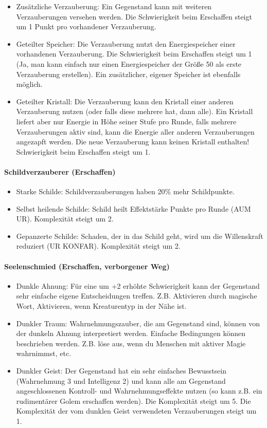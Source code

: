 \documentclass{article}
\begin{document}
\begin{itemize}
\item Zusätzliche Verzauberung: Ein Gegenstand kann mit weiteren Verzauberungen versehen werden. Die Schwierigkeit beim Erschaffen steigt um 1 Punkt pro vorhandener Verzauberung.
\item Geteilter Speicher: Die Verzauberung nutzt den Energiespeicher einer vorhandenen Verzauberung. Die Schwierigkeit beim Erschaffen steigt um 1 (Ja, man kann einfach nur einen Energiespeicher der Größe 50 als erste Verzauberung erstellen). Ein zusätzlicher, eigener Speicher ist ebenfalls möglich.
\item Geteilter Kristall: Die Verzauberung kann den Kristall einer anderen Verzauberung nutzen (oder falls diese mehrere hat, dann alle). Ein Kristall liefert aber nur Energie in Höhe seiner Stufe pro Runde, falls mehrere Verzauberungen aktiv sind, kann die Energie aller anderen Verzauberungen angezapft werden. Die neue Verzauberung kann keinen Kristall enthalten! Schwierigkeit beim Erschaffen steigt um 1.
\end{itemize}

\paragraph{Schildverzauberer (Erschaffen)}

\begin{itemize}
\item Starke Schilde: Schildverzauberungen haben 20\% mehr Schildpunkte.
\item Selbst heilende Schilde: Schild heilt Effektstärke Punkte pro Runde (AUM UR). Komplexität steigt um 2.
\item Gepanzerte Schilde: Schaden, der in das Schild geht, wird um die Willenskraft reduziert (UR KONFAR). Komplexität steigt um 2.
\end{itemize}

\paragraph{Seelenschmied (Erschaffen, verborgener Weg)}

\begin{itemize}
\item Dunkle Ahnung: Für eine um +2 erhöhte Schwierigkeit kann der Gegenstand sehr einfache eigene Entscheidungen treffen. Z.B. Aktivieren durch magische Wort, Aktivieren, wenn Kreaturentyp in der Nähe ist.
\item Dunkler Traum: Wahrnehmungszauber, die am Gegenstand sind, können von der dunkeln Ahnung interpretiert werden. Einfache Bedingungen können beschrieben werden. Z.B. löse aus, wenn du Menschen mit aktiver Magie wahrnimmst, etc.
\item Dunkler Geist: Der Gegenstand hat ein sehr einfaches Bewusstsein (Wahrnehmung 3 und Intelligenz 2) und kann alle am Gegenstand angeschlossenen Kontroll- und Wahrnehmungseffekte nutzen (so kann z.B. ein rudimentärer Golem erschaffen werden). Die Komplexität steigt um 5. Die Komplexität der vom dunklen Geist verwendeten Verzauberungen steigt um 1.
\end{itemize}
\end{document}
